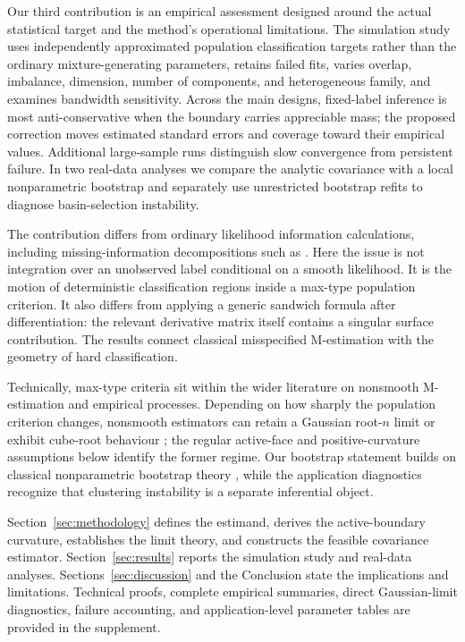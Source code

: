 \documentclass[numsec,webpdf,modern,medium,namedate]{oup-authoring-template}
\theoremstyle{plain}
\theoremstyle{definition}
\theoremstyle{remark}
\begin{document}
Our third contribution is an empirical assessment designed around the actual
statistical target and the method's operational limitations.  The simulation
study uses independently approximated population classification targets rather
than the ordinary mixture-generating parameters, retains failed fits, varies
overlap, imbalance, dimension, number of components, and heterogeneous family,
and examines bandwidth sensitivity.  Across the main designs, fixed-label
inference is most anti-conservative when the boundary carries appreciable
mass; the proposed correction moves estimated standard errors and coverage
toward their empirical values.  Additional large-sample runs distinguish slow
convergence from persistent failure.  In two real-data analyses we compare the
analytic covariance with a local nonparametric bootstrap and separately use
unrestricted bootstrap refits to diagnose basin-selection instability.

The contribution differs from ordinary likelihood information calculations,
including missing-information decompositions such as \citet{Louis1982FindingTO}.
Here the issue is not integration over an unobserved label conditional on a
smooth likelihood.  It is the motion of deterministic classification regions
inside a max-type population criterion.  It also differs from applying a
generic sandwich formula after differentiation: the relevant derivative
matrix itself contains a singular surface contribution.  The results connect
classical misspecified M-estimation \citep{Huber1967,white1982maximum} with the
geometry of hard classification.

Technically, max-type criteria sit within the wider literature on nonsmooth
M-estimation and empirical processes. Depending on how sharply the population
criterion changes, nonsmooth estimators can retain a Gaussian root-$n$ limit
or exhibit cube-root behaviour \citep{kim1990cube,sherman1993limiting}; the
regular active-face and positive-curvature assumptions below identify the
former regime. Our bootstrap statement builds on classical nonparametric
bootstrap theory \citep{efron1979bootstrap,efron1993introduction}, while the
application diagnostics recognize that clustering instability is a separate
inferential object.

Section~\ref{sec:methodology} defines the estimand, derives the active-boundary
curvature, establishes the limit theory, and constructs the feasible
covariance estimator. Section~\ref{sec:results} reports the simulation study
and real-data analyses. Sections~\ref{sec:discussion} and the Conclusion state
the implications and limitations. Technical proofs, complete empirical
summaries, direct Gaussian-limit diagnostics, failure accounting, and
application-level parameter tables are provided in the supplement.
\end{document}
